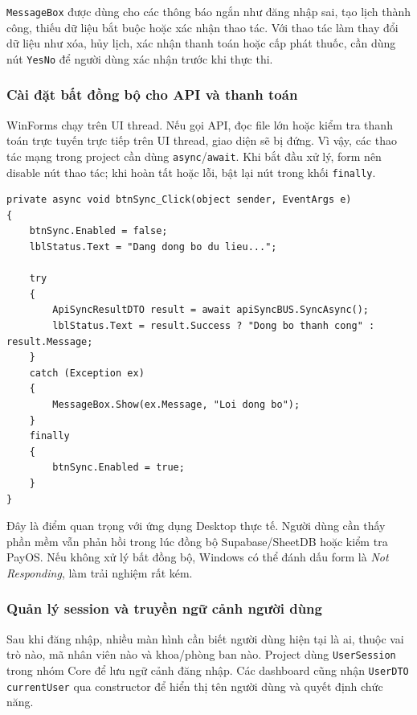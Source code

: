 \documentclass[12pt,a4paper]{article}
\numberwithin{figure}{subsection}
\numberwithin{table}{subsection}
\newcounter{codecounter}
\newenvironment{codeblock}[2]{%
    \refstepcounter{codecounter}%
    \phantomsection%
    \label{#1}%
    \par\smallskip
}{%
    \par\smallskip
}
\begin{document}
\texttt{MessageBox} được dùng cho các thông báo ngắn như đăng nhập sai, tạo lịch thành công, thiếu dữ liệu bắt buộc hoặc xác nhận thao tác. Với thao tác làm thay đổi dữ liệu như xóa, hủy lịch, xác nhận thanh toán hoặc cấp phát thuốc, cần dùng nút \texttt{YesNo} để người dùng xác nhận trước khi thực thi.

\subsubsection{Cài đặt bất đồng bộ cho API và thanh toán}

WinForms chạy trên UI thread. Nếu gọi API, đọc file lớn hoặc kiểm tra thanh toán trực tuyến trực tiếp trên UI thread, giao diện sẽ bị đứng. Vì vậy, các thao tác mạng trong project cần dùng \texttt{async}/\texttt{await}. Khi bắt đầu xử lý, form nên disable nút thao tác; khi hoàn tất hoặc lỗi, bật lại nút trong khối \texttt{finally}.

\begin{codeblock}{code:async-winform}{Gọi tác vụ bất đồng bộ từ WinForms}
\begin{verbatim}
private async void btnSync_Click(object sender, EventArgs e)
{
    btnSync.Enabled = false;
    lblStatus.Text = "Dang dong bo du lieu...";

    try
    {
        ApiSyncResultDTO result = await apiSyncBUS.SyncAsync();
        lblStatus.Text = result.Success ? "Dong bo thanh cong" : result.Message;
    }
    catch (Exception ex)
    {
        MessageBox.Show(ex.Message, "Loi dong bo");
    }
    finally
    {
        btnSync.Enabled = true;
    }
}
\end{verbatim}
\end{codeblock}

Đây là điểm quan trọng với ứng dụng Desktop thực tế. Người dùng cần thấy phần mềm vẫn phản hồi trong lúc đồng bộ Supabase/SheetDB hoặc kiểm tra PayOS. Nếu không xử lý bất đồng bộ, Windows có thể đánh dấu form là \textit{Not Responding}, làm trải nghiệm rất kém.

\subsubsection{Quản lý session và truyền ngữ cảnh người dùng}

Sau khi đăng nhập, nhiều màn hình cần biết người dùng hiện tại là ai, thuộc vai trò nào, mã nhân viên nào và khoa/phòng ban nào. Project dùng \texttt{UserSession} trong nhóm Core để lưu ngữ cảnh đăng nhập. Các dashboard cũng nhận \texttt{UserDTO currentUser} qua constructor để hiển thị tên người dùng và quyết định chức năng.
\end{document}
